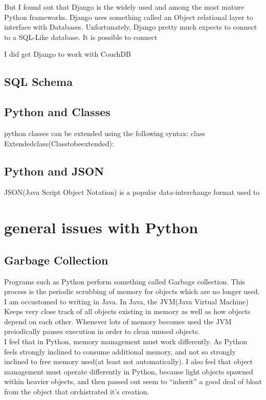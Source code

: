 But I found out that Django is the widely used and among the most mature Python frameworks.  Django uses something called an Object relational layer to interface with Databases.  Unfortunately, Django pretty much expects to connect to a SQL-Like database.  It is possible to connect 

I did get Django to work with CouchDB


\subsection{SQL Schema}



\subsection{Python and Classes}

python classes can be extended using the following syntax:
    class Extendedclass(Classtobeextended):

\subsection{Python and JSON}
JSON(Java Script Object Notation) is a popular data-interchange format used to


\section{general issues with Python}

\subsection{Garbage Collection}

Programs such as Python perform something called Garbage collection.  This process is the periodic scrubbing of memory for objects which are no longer used.\\
I am occustomed to writing in Java.  In Java, the JVM(Java Virtual Machine) Keeps very close track of all objects existing in memory as well as how objects depend on each other.  Whenever lots of memory becomes used the JVM preiodically pauses execution in order to clean unused objects.\\
I feel that in Python, memory management must work differently.  As Python feels strongly inclined to consume additional memory, and not so strongly inclined to free memory used(at least not automatically).  I also feel that object management must operate differently in Python, because light objects spawned within heavier objects, and then passed out seem to ``inherit'' a good deal of bloat from the object that orchistrated it's creation.


